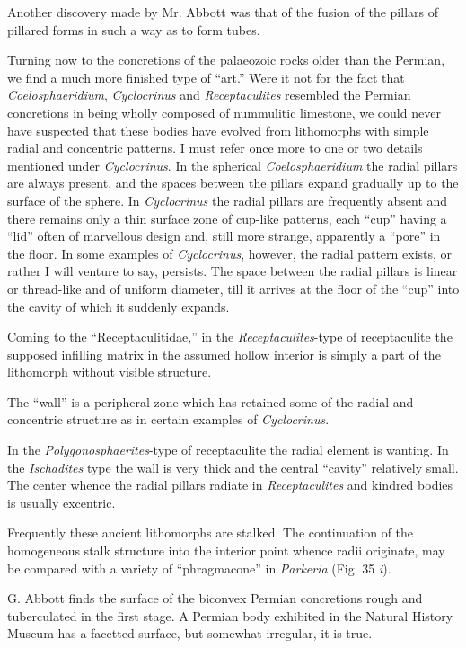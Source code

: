 \documentclass[a4paper, 12pt, oneside, landscape]{article}
\begin{document}
Another discovery made by Mr. Abbott was that of the fusion of the pillars of pillared forms in such a way as to form tubes.

Turning now to the concretions of the palaeozoic rocks older than the Permian, we find a much more finished type of ``art.'' Were it not for the fact that \emph{Coelosphaeridium}, \emph{Cyclocrinus} and \emph{Receptaculites} resembled the Permian concretions in being wholly composed of nummulitic limestone, we could never have suspected that these bodies have evolved from lithomorphs with simple radial and concentric patterns. I must refer once more to one or two details mentioned under \emph{Cyclocrinus}. In the spherical \emph{Coelosphaeridium} the radial pillars are always present, and the spaces between the pillars expand gradually up to the surface of the sphere. In \emph{Cyclocrinus} the radial pillars are frequently absent and there remains only a thin surface zone of cup-like patterns, each ``cup'' having a ``lid'' often of marvellous design and, still more strange, apparently a ``pore'' in the floor. In some examples of \emph{Cyclocrinus}, however, the radial pattern exists, or rather I will venture to say, persists. The space between the radial pillars is linear or thread-like and of uniform diameter, till it arrives at the floor of the ``cup'' into the cavity of which it suddenly expands.

Coming to the ``Receptaculitidae,'' in the \emph{Receptaculites}-type of receptaculite the supposed infilling matrix in the assumed hollow interior is simply a part of the lithomorph without visible structure.

The ``wall'' is a peripheral zone which has retained some of the radial and concentric structure as in certain examples of \emph{Cyclocrinus}.

In the \emph{Polygonosphaerites}-type of receptaculite the radial element is wanting. In the \emph{Ischadites} type the wall is very thick and the central ``cavity'' relatively small. The center whence the radial pillars radiate in \emph{Receptaculites} and kindred bodies is usually excentric.

Frequently these ancient lithomorphs are stalked. The continuation of the homogeneous stalk structure into the interior point whence radii originate, may be compared with a variety of ``phragmacone'' in \emph{Parkeria} (Fig. 35 \emph{i}).

G. Abbott finds the surface of the biconvex Permian concretions rough and tuberculated in the first stage. A Permian body exhibited in the Natural History Museum has a facetted surface, but somewhat irregular, it is true.
\end{document}

